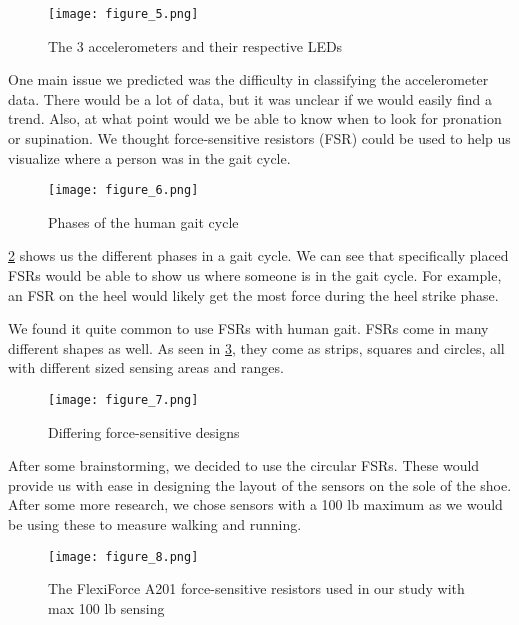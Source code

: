\begin{figure}[h]
  \centering
  \texttt{[image: figure\_5.png]}
  \caption[Accelerometer LEDs]{The 3 accelerometers and their respective LEDs}
  \label{fig:x 3-leds}
\end{figure}

One main issue we predicted was the difficulty in classifying the accelerometer data.
There would be a lot of data, but it was unclear if we would easily find a trend.
Also, at what point would we be able to know when to look for pronation or supination.
We thought force-sensitive resistors (FSR) could be used to help us visualize where a person was in the gait cycle.\par

\begin{figure}[h]
  \centering
  \texttt{[image: figure\_6.png]}
  \caption[Gait cycle]{Phases of the human gait cycle \parencite{tekscan-cycle}}
  \label{fig:x gait cycle}
\end{figure}

\ref{fig:x gait cycle} shows us the different phases in a gait cycle.
We can see that specifically placed FSRs would be able to show us where someone is in the gait cycle.
For example, an FSR on the heel would likely get the most force during the heel strike phase.\par

We found it quite common to use FSRs with human gait.
FSRs come in many different shapes as well.
As seen in \ref{fig:x fsr designs}, they come as strips, squares and circles, all with different sized sensing areas and ranges.\par

\begin{figure}[h]
  \centering
  \texttt{[image: figure\_7.png]}
  \caption[FSR designs]{Differing force-sensitive designs \parencite{mouser}}
  \label{fig:x fsr designs}
\end{figure}

After some brainstorming, we decided to use the circular FSRs.
These would provide us with ease in designing the layout of the sensors on the sole of the shoe.
After some more research, we chose sensors with a 100 lb maximum as we would be using these to measure walking and running.\par

\begin{figure}[h]
  \centering
  \texttt{[image: figure\_8.png]}
  \caption[FlexiForce A201]{The FlexiForce A201 force-sensitive resistors used in our study with max 100 lb sensing \parencite{tekscan-sensor}}
  \label{fig:x flexiforce}
\end{figure}

